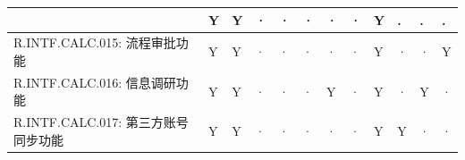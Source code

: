 \begin{table}[htbp]
\begin{tabular}{|p{9em}|p{2em}|p{2em}|p{2em}|p{2em}|p{2em}|
                            p{2em}|p{2em}|p{2em}|p{2em}|p{2em}|p{2em}|}
                & Y                     & Y                 & · 
                & ·                     & ·                 & · 
                & ·                     & Y                 & .
                & .                     & . \\
            \hline %
            {\color{red}R.INTF.CALC.015: 流程审批功能}
                & {\color{red}Y}        & {\color{red}Y}    & {\color{red}·}
                & {\color{red}·}        & {\color{red}·}    & {\color{red}·}
                & {\color{red}·}        & {\color{red}Y}    & {\color{red}·}
                & {\color{red}·}        & {\color{red}Y} \\
            \hline %
            {\color{red}R.INTF.CALC.016: 信息调研功能}
                & {\color{red}Y}        & {\color{red}Y}    & {\color{red}·}
                & {\color{red}·}        & {\color{red}·}    & {\color{red}Y}
                & {\color{red}·}        & {\color{red}Y}    & {\color{red}·}
                & {\color{red}Y}        & {\color{red}·}\\
            \hline %
            {\color{red}R.INTF.CALC.017: 第三方账号同步功能}
                & {\color{red}Y}        & {\color{red}Y}    & {\color{red}·}
                & {\color{red}·}        & {\color{red}·}    & {\color{red}·}
                & {\color{red}·}        & {\color{red}Y}    & {\color{red}Y}
                & {\color{red}·}        & {\color{red}·}\\
            \hline %
            \end{tabular}
    \end{table}
